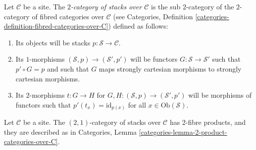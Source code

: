 \begin{definition}
\label{definition-stacks-over-C}
Let $\mathcal{C}$ be a site.
The {\it $2$-category of stacks over $\mathcal{C}$}
is the sub $2$-category of the $2$-category of fibred categories
over $\mathcal{C}$ (see
Categories, Definition \ref{categories-definition-fibred-categories-over-C})
defined as follows:
\begin{enumerate}
\item Its objects will be stacks $p : \mathcal{S} \to \mathcal{C}$.
\item Its $1$-morphisms $(\mathcal{S}, p) \to (\mathcal{S}', p')$
will be functors $G : \mathcal{S} \to \mathcal{S}'$ such that
$p' \circ G = p$ and such that $G$ maps strongly cartesian
morphisms to strongly cartesian morphisms.
\item Its $2$-morphisms $t : G \to H$ for
$G, H : (\mathcal{S}, p) \to (\mathcal{S}', p')$
will be morphisms of functors
such that $p'(t_x) = \text{id}_{p(x)}$
for all $x \in \text{Ob}(\mathcal{S})$.
\end{enumerate}
\end{definition}

\begin{lemma}
\label{lemma-2-product-stacks}
Let $\mathcal{C}$ be a site.
The $(2, 1)$-category of stacks over $\mathcal{C}$
has 2-fibre products, and they are described as in
Categories, Lemma \ref{categories-lemma-2-product-categories-over-C}.
\end{lemma}

